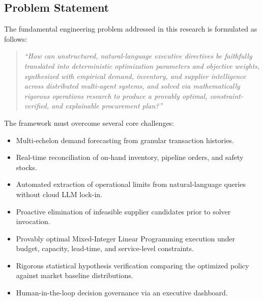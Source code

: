 \documentclass[conference]{IEEEtran}
\begin{document}
\subsection{Problem Statement}
The fundamental engineering problem addressed in this research is formulated as follows:
\begin{quote}
\textit{``How can unstructured, natural-language executive directives be faithfully translated into deterministic optimization parameters and objective weights, synthesized with empirical demand, inventory, and supplier intelligence across distributed multi-agent systems, and solved via mathematically rigorous operations research to produce a provably optimal, constraint-verified, and explainable procurement plan?''}
\end{quote}

The framework must overcome several core challenges:
\begin{itemize}
    \item Multi-echelon demand forecasting from granular transaction histories.
    \item Real-time reconciliation of on-hand inventory, pipeline orders, and safety stocks.
    \item Automated extraction of operational limits from natural-language queries without cloud LLM lock-in.
    \item Proactive elimination of infeasible supplier candidates prior to solver invocation.
    \item Provably optimal Mixed-Integer Linear Programming execution under budget, capacity, lead-time, and service-level constraints.
    \item Rigorous statistical hypothesis verification comparing the optimized policy against market baseline distributions.
    \item Human-in-the-loop decision governance via an executive dashboard.
\end{itemize}
\end{document}
